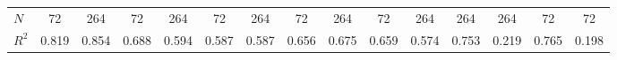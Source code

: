 \begin{table}[htbp]
\begin{tabular}{l*{14}{c}}
\hline
\(N\)       &          72         &         264         &          72         &         264         &          72         &         264         &          72         &         264         &          72         &         264         &         264         &         264         &          72         &          72         \\
\(R^{2}\)   &       0.819         &       0.854         &       0.688         &       0.594         &       0.587         &       0.587         &       0.656         &       0.675         &       0.659         &       0.574         &       0.753         &       0.219         &       0.765         &       0.198         \\
\hline\hline
\end{tabular}
\end{table}
